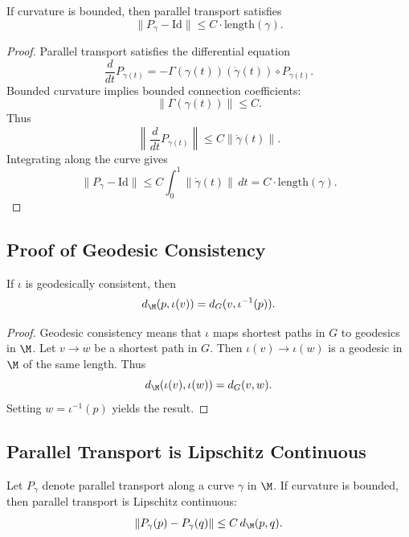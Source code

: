 \begin{lemma}
If curvature is bounded, then parallel transport satisfies
\[
\|P_\gamma - \mathrm{Id}\|
\le C \cdot \mathrm{length}(\gamma).
\]
\end{lemma}

\begin{proof}
Parallel transport satisfies the differential equation
\[
\frac{d}{dt} P_{\gamma(t)}
= -\Gamma(\gamma(t))(\dot{\gamma}(t)) \circ P_{\gamma(t)}.
\]
Bounded curvature implies bounded connection coefficients:
\[
\|\Gamma(\gamma(t))\| \le C.
\]
Thus
\[
\left\| \frac{d}{dt} P_{\gamma(t)} \right\|
\le C \|\dot{\gamma}(t)\|.
\]
Integrating along the curve gives
\[
\|P_\gamma - \mathrm{Id}\|
\le C \int_0^1 \|\dot{\gamma}(t)\|\, dt
= C \cdot \mathrm{length}(\gamma).
\]
\end{proof}

\subsection{Proof of Geodesic Consistency}

\begin{lemma}
If $\iota$ is geodesically consistent, then
\[
d_\M(p, \iota(v)) = d_G(v, \iota^{-1}(p)).
\]
\end{lemma}

\begin{proof}
Geodesic consistency means that $\iota$ maps shortest paths in $G$ to
geodesics in $\M$. Let $v \to w$ be a shortest path in $G$. Then
$\iota(v) \to \iota(w)$ is a geodesic in $\M$ of the same length. Thus
\[
d_\M(\iota(v), \iota(w)) = d_G(v,w).
\]
Setting $w = \iota^{-1}(p)$ yields the result.
\end{proof}



\subsection{Parallel Transport is Lipschitz Continuous}

\begin{lemma}
Let $P_\gamma$ denote parallel transport along a curve $\gamma$ in $\M$.
If curvature is bounded, then parallel transport is Lipschitz continuous:
\[
\| P_\gamma(p) - P_\gamma(q) \|
\le
C\, d_\M(p,q).
\]
\end{lemma}

